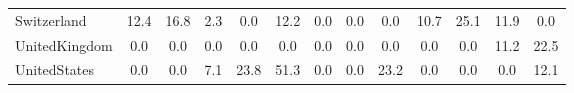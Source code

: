\begin{table}[htbp]
\begin{tabular}{lcccccccccccc}
Switzerland &      12.4 &      16.8 &       2.3 &       0.0 &      12.2 &       0.0 &       0.0 &       0.0 &      10.7 &      25.1 &      11.9 &       0.0 \\  
UnitedKingdom &       0.0 &       0.0 &       0.0 &       0.0 &       0.0 &       0.0 &       0.0 &       0.0 &       0.0 &       0.0 &      11.2 &      22.5 \\  
UnitedStates &       0.0 &       0.0 &       7.1 &      23.8 &      51.3 &       0.0 &       0.0 &      23.2 &       0.0 &       0.0 &       0.0 &      12.1 \\  
\hline \hline \end{tabular}
\end{table}
